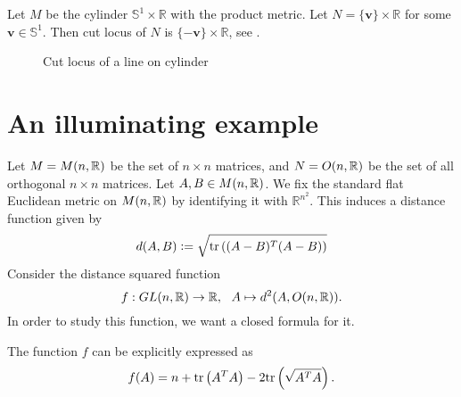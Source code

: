 \begin{eg}
    Let $M$ be the cylinder $\mathbb{S}^1\times \mathbb{R}$ with the product metric. Let $N=\{\mathbf{v}\}\times \mathbb{R}$ for some $\mathbf{v} \in \mathbb{S}^1$. Then cut locus of $N$ is $\{-\mathbf{v}\}\times \mathbb{R}$, see . 
    \begin{figure}[!htpb]
        \centering
        \caption{Cut locus of a line on cylinder \label{fig:Example-CutLocus-Cylinder-Submanifold}}
    \end{figure}
    
\end{eg}

\section{An illuminating example}\label{Sec:IlluminatingExample}
\hfb Let $ M = M(n,\mathbb{R}) $ be the set of $n\times n$ matrices, and $ N=O(n,\mathbb{R}) $ be the set of all orthogonal $n\times n$ matrices. Let $A,B\in M(n,\mathbb{R})$. We fix the standard flat Euclidean metric on $M(n,\mathbb{R})$ by identifying it with $\mathbb{R}^{n^2}$. This induces a distance function given by
\begin{equation*}\label{Example 1 Eq: 1}
	d(A,B) \vcentcolon= \sqrt{\mathrm{tr}\left( (A-B)^T(A-B) \right)}
\end{equation*}
Consider the distance squared function
\begin{displaymath}
    f: GL(n,\mathbb{R})\to \mathbb{R},~~ A\mapsto d^2(A, O(n,\mathbb{R})).
\end{displaymath}
In order to study this function, we want a closed formula for it.
\begin{lemma}
    The function $f$ can be explicitly expressed as 
    \begin{equation}\label{eq:d2On}
        f(A) = n + \mathrm{tr}\left( A^TA \right) - 2\mathrm{tr}\left( \sqrt{A^TA} \right).
    \end{equation} 
\end{lemma}

